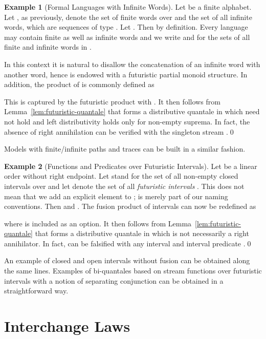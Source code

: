 \documentclass[12pt]{article}
\theoremstyle{definition}
\newtheorem{example}{Example}
\begin{document}
\begin{example}[Formal Languages with Infinite Words]
  Let  be a finite alphabet. Let , as previously,
  denote the set of finite words over  and  the
  set of all infinite words, which are sequences of type
  . Let
  . Then  by definition. Every language
   may contain finite as well as infinite
  words and we write  and  for
  the sets of all finite and infinite words in .

  In this context it is natural to disallow the concatenation of an
  infinite word with another word, hence  is endowed
  with a futuristic partial monoid structure. In addition, the product
  of  is commonly defined as
  
  This is captured by the futuristic product with . It
  then follows from Lemma~\ref{lem:futuristic-quantale} that
   forms a distributive quantale in which
   need not hold and left distributivity
  holds only for non-empty suprema. In fact, the absence of right
  annihilation can be verified with the singleton stream
  .\qed
\end{example}
Models with finite/infinite paths and traces can be built in a similar
fashion.

\begin{example}[Functions and Predicates over Futuristic Intervals]
  Let  be a linear order without right endpoint. Let 
  stand for the set of all non-empty closed intervals over  and let
   denote the set of all \emph{futuristic intervals}
  . This does not mean that we add an
  explicit element  to ;  is merely part of our
  naming conventions. Then  and . The fusion product of intervals can now be
  redefined as

where  is included as an option.  It then follows
from Lemma~\ref{lem:futuristic-quantale} that  forms a
distributive quantale in which  is not necessarily a right
annihilator. In fact,  can be falsified with any
interval  and interval predicate .\qed
\end{example}
An example of closed and open intervals without fusion can be obtained
along the same lines. Examples of bi-quantales based on stream
functions over futuristic intervals with a notion of separating
conjunction can be obtained in a straightforward way.



\section{Interchange Laws}\label{sec:interchange}
\end{document}
